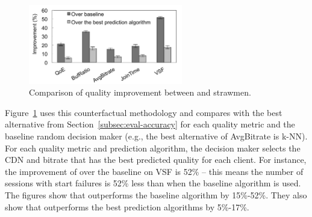 \begin{figure}[t!]
\centering
\includegraphics[width=0.6\textwidth]{figures/cfa-CF-IMPROVEMENT-Perc-Grouped.pdf}
\caption{Comparison of quality improvement 
between \dda and strawmen.}
\label{fig:trace-driven-improvement}
\end{figure}


Figure~\ref{fig:trace-driven-improvement} uses this 
counterfactual methodology and compares \dda with the 
best alternative from Section~\ref{subsec:eval-accuracy} for 
each quality metric and the baseline random decision 
maker (e.g., the best alternative of AvgBitrate is k-NN). 
For each quality metric and prediction algorithm, the 
decision maker selects the CDN and bitrate that has 
the  best predicted quality for each client. 
For instance, the improvement of \dda over the baseline 
on VSF is 52\% -- this means the number of sessions 
with start failures is 52\% less than when the baseline 
algorithm is used.
The figures show that \dda outperforms the baseline 
algorithm by 15\%-52\%. 
They also show that \dda outperforms the best prediction 
algorithms by 5\%-17\%. %



